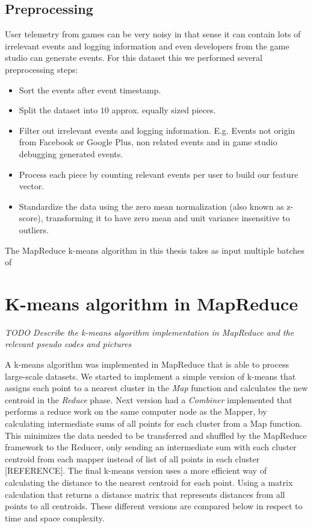 \subsection{Preprocessing}
User telemetry from games can be very noisy in that sense it can contain lots of irrelevant events and logging information and even developers from the game studio can generate events. For this dataset this we performed several preprocessing steps:
\begin{itemize}
\item Sort the events after event timestamp.
\item Split the dataset into $10$ approx. equally sized pieces.
\item Filter out irrelevant events and logging information. E.g. Events not origin from Facebook or Google Plus, non related events and in game studio debugging generated events.
\item Process each piece by counting relevant events per user to build our feature vector.
\item Standardize the data using the zero mean normalization (also known as z-score), transforming it to have zero mean and unit variance insensitive to outliers.
\end{itemize}

The MapReduce k-means algorithm in this thesis takes as input multiple batches of 


\section{K-means algorithm in MapReduce}
\textit{TODO Describe the k-means algorithm implementation in MapReduce and the relevant pseudo codes and pictures}


A k-means algorithm was implemented in MapReduce that is able to process large-scale datasets. We started to implement a simple version of k-means that assigns each point to a nearest cluster in the \textit{Map} function and calculates the new centroid in the \textit{Reduce} phase. Next version had a \textit{Combiner} implemented that performs a reduce work on the same computer node as the Mapper, by calculating intermediate sums of all points for each cluster from a Map function. This minimizes the data needed to be transferred and shuffled by the MapReduce framework to the Reducer, only sending an intermediate sum with each cluster centroid from each mapper instead of list of all points in each cluster [REFERENCE]. The final k-means version uses a more efficient way of calculating the distance to the nearest centroid for each point. Using a matrix calculation that returns a distance matrix that represents distances from all points to all centroids. These different versions are compared below in respect to time and space complexity.


